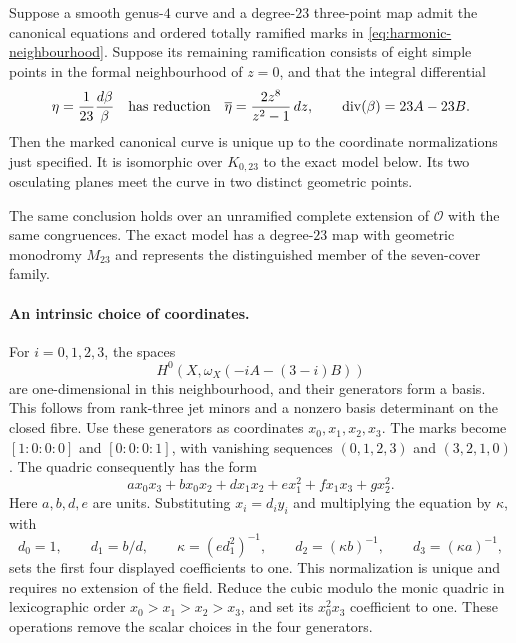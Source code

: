\begin{theorem}
\label{thm:harmonic-local-incidence}
Suppose a smooth genus-$4$ curve and a degree-$23$ three-point map
admit the canonical equations and ordered totally ramified marks in
\cref{eq:harmonic-neighbourhood}.  Suppose its remaining ramification
consists of eight simple points in the formal neighbourhood of $z=0$,
and that the integral differential
\[
 \eta=\frac{1}{23}\frac{d\beta}{\beta}
 \quad\hbox{has reduction}\quad
 \overline\eta=\frac{2z^8}{z^2-1}\,dz,
 \qquad \operatorname{div}(\beta)=23A-23B.
\]
Then the marked canonical curve is unique up to the coordinate
normalizations just specified.  It is isomorphic over $K_{0,23}$
to the exact model below.  Its two osculating planes meet the curve
in two distinct geometric points.

The same conclusion holds over an unramified complete extension of
$\mathcal O$ with the same congruences.  The exact model has a
degree-$23$ map with geometric monodromy $M_{23}$ and represents the
distinguished member of the seven-cover family.
\end{theorem}

\paragraph{An intrinsic choice of coordinates.}
For $i=0,1,2,3$, the spaces
\[
 H^0(X,\omega_X(-iA-(3-i)B))
\]
are one-dimensional in this neighbourhood, and their generators form
a basis.  This follows from rank-three jet minors and a nonzero
basis determinant on the closed fibre.  Use these generators as
coordinates $x_0,x_1,x_2,x_3$.  The marks become
$[1:0:0:0]$ and $[0:0:0:1]$, with vanishing sequences
$(0,1,2,3)$ and $(3,2,1,0)$.
The quadric consequently has the form
\[
 ax_0x_3+bx_0x_2+dx_1x_2+ex_1^2+fx_1x_3+gx_2^2.
\]
Here $a,b,d,e$ are units.  Substituting $x_i=d_i y_i$ and multiplying
the equation by $\kappa$, with
\[
 d_0=1,\qquad d_1=b/d,\qquad
 \kappa=(ed_1^2)^{-1},\qquad
 d_2=(\kappa b)^{-1},\qquad d_3=(\kappa a)^{-1},
\]
sets the first four displayed coefficients to one.
This normalization is unique and requires no extension of the field.
Reduce the cubic modulo the monic quadric in lexicographic order
$x_0>x_1>x_2>x_3$, and set its $x_0^2x_3$ coefficient to one.
These operations remove the scalar choices in the four generators.


